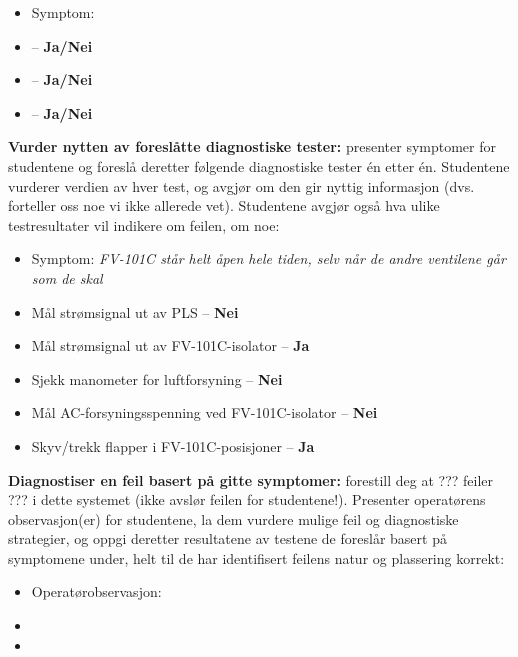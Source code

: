 \begin{itemize}
\item{} Symptom: {\it }
\item{}  -- {\bf Ja/Nei}
\item{}  -- {\bf Ja/Nei}
\item{}  -- {\bf Ja/Nei}
\end{itemize}


\vskip 10pt


\noindent
{\bf Vurder nytten av foreslåtte diagnostiske tester:} presenter symptomer for studentene og foreslå deretter følgende diagnostiske tester én etter én. Studentene vurderer verdien av hver test, og avgjør om den gir nyttig informasjon (dvs. forteller oss noe vi ikke allerede vet). Studentene avgjør også hva ulike testresultater vil indikere om feilen, om noe:

\begin{itemize}
\item{} Symptom: {\it FV-101C står helt åpen hele tiden, selv når de andre ventilene går som de skal}
\item{} Mål strømsignal ut av PLS -- {\bf Nei}
\item{} Mål strømsignal ut av FV-101C-isolator -- {\bf Ja}
\item{} Sjekk manometer for luftforsyning -- {\bf Nei}
\item{} Mål AC-forsyningsspenning ved FV-101C-isolator -- {\bf Nei}
\item{} Skyv/trekk flapper i FV-101C-posisjoner -- {\bf Ja}
\end{itemize}


\vskip 10pt


\noindent
{\bf Diagnostiser en feil basert på gitte symptomer:} forestill deg at ??? feiler ??? i dette systemet (ikke avslør feilen for studentene!). Presenter operatørens observasjon(er) for studentene, la dem vurdere mulige feil og diagnostiske strategier, og oppgi deretter resultatene av testene de foreslår basert på symptomene under, helt til de har identifisert feilens natur og plassering korrekt:

\begin{itemize}
\item{} Operatørobservasjon: {\it }
\item{} 
\item{} 
\end{itemize}











